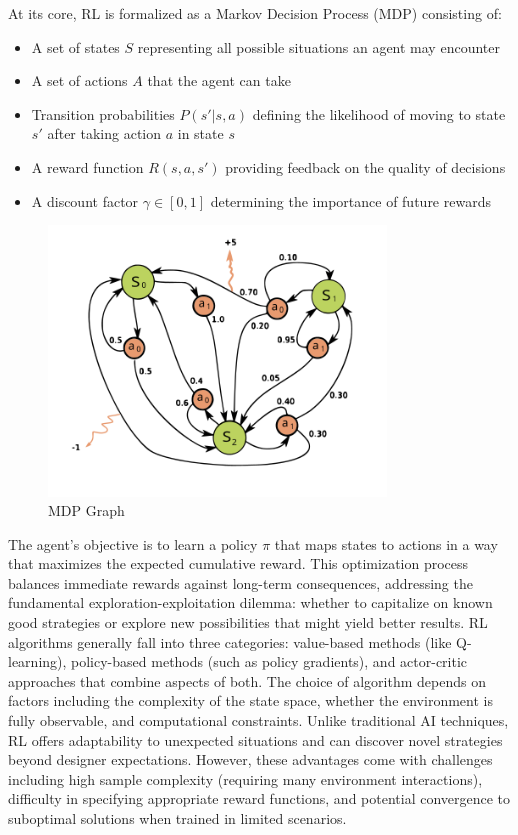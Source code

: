 At its core, RL is formalized as a Markov Decision Process (MDP) consisting of:
\begin{itemize}
    \item A set of states $S$ representing all possible situations an agent may encounter
    \item A set of actions $A$ that the agent can take
    \item Transition probabilities $P(s'|s,a)$ defining the likelihood of moving to state $s'$ after taking action $a$ in state $s$
    \item A reward function $R(s,a,s')$ providing feedback on the quality of decisions
    \item A discount factor $\gamma \in [0,1]$ determining the importance of future rewards
\end{itemize}

\begin{figure}[ht]
    \centering
    \includegraphics[width=0.8\textwidth]{figures/mdp_framework.png}
    \caption{MDP Graph}
    \label{fig:mdp-framework}
\end{figure}

The agent's objective is to learn a policy $\pi$ that maps states to actions in a way that maximizes the expected cumulative reward. 
This optimization process balances immediate rewards against long-term consequences, addressing the fundamental exploration-exploitation dilemma: whether to capitalize on known good strategies or explore new possibilities that might yield better results.
RL algorithms generally fall into three categories: value-based methods (like Q-learning), policy-based methods (such as policy gradients), and actor-critic approaches that combine aspects of both. 
The choice of algorithm depends on factors including the complexity of the state space, whether the environment is fully observable, and computational constraints.
Unlike traditional AI techniques, RL offers adaptability to unexpected situations and can discover novel strategies beyond designer expectations. 
However, these advantages come with challenges including high sample complexity (requiring many environment interactions), difficulty in specifying appropriate reward functions, and potential convergence to suboptimal solutions when trained in limited scenarios.

